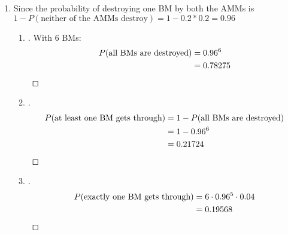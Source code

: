 \documentclass[paper=usletter, fontsize=12pt]{article}
\begin{document}
\begin{enumerate}
        \item Since the probability of destroying one BM by both the AMMs is\\
        $1-P(\text{neither of the AMMs destroy}) = 1-0.2*0.2=0.96$
            \begin{enumerate}

                \item
                \begin{proof}[\unskip\nopunct]
                    With 6 BMs:
                    \begin{align*}
                        P(\text{all BMs are destroyed}) & = 0.96^6\\
                        & = 0.78275 \qedhere
                    \end{align*}
                \end{proof}

                \item
                \begin{proof}[\unskip\nopunct]
                    \begin{align*}
                        P(\text{at least one BM gets through}) & = 1 - P(\text{all BMs are destroyed}) \\
                        & = 1-0.96^6 \\
                        & = 0.21724 \qedhere
                    \end{align*}
                \end{proof}

                \item
                \begin{proof}[\unskip\nopunct]
                    \begin{align*}
                        P(\text{exactly one BM gets through}) & = 6\cdot 0.96^5\cdot 0.04\\
                        & = 0.19568 \qedhere
                    \end{align*}
                \end{proof}

            \end{enumerate}


\end{enumerate}
\end{document}
